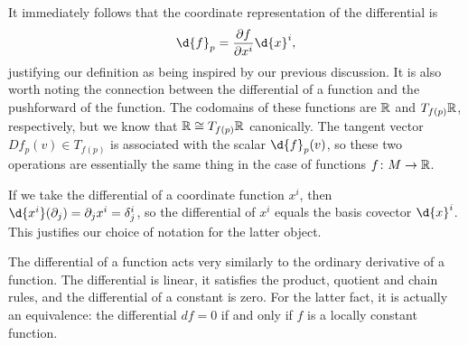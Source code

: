 \documentclass[a4paper,12pt]{article}
\begin{document}
\begin{remark}
    It immediately follows that the coordinate representation of the differential is
    \begin{equation}
        \d{f}_p = \frac{\partial f}{\partial x^i} \d{x}^i,
    \end{equation}
    justifying our definition as being inspired by our previous discussion.
    It is also worth noting the connection between the differential of a function and the pushforward of the function.
    The codomains of these functions are $\mathbb{R}$ and $T_{f(p)} \mathbb{R}$, respectively, but we know that $\mathbb{R} \cong T_{f(p)} \mathbb{R}$ canonically.
    The tangent vector $Df_p(v) \in T_{f(p)}$ is associated with the scalar $\d{f}_p(v)$, so these two operations are essentially the same thing in the case of functions $f \colon M \to \mathbb{R}$.
\end{remark}
If we take the differential of a coordinate function $x^i$, then $\d{x^i}(\partial_j) = \partial_j x^i = \delta^i_j$, so the differential of $x^i$ equals the basis covector $\d{x}^i$.
This justifies our choice of notation for the latter object.

The differential of a function acts very similarly to the ordinary derivative of a function.
The differential is linear, it satisfies the product, quotient and chain rules, and the differential of a constant is zero.
For the latter fact, it is actually an equivalence: the differential $df = 0$ if and only if $f$ is a locally constant function.
\end{document}
